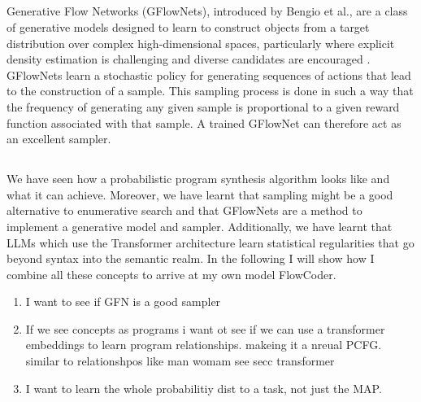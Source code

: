 \subsection{}
Generative Flow Networks (GFlowNets), introduced by Bengio et al., are a class of generative models designed to learn to construct objects from a target distribution over complex high-dimensional spaces, particularly where explicit density estimation is challenging and diverse candidates are encouraged \cite{bengio_flow_2021}. GFlowNets learn a stochastic policy for generating sequences of actions that lead to the construction of a sample. This sampling process is done in such a way that the frequency of generating any given sample is proportional to a given reward function associated with that sample. A trained GFlowNet can therefore act as an excellent sampler.
















\subsection{}

We have seen how a probabilistic program synthesis algorithm looks like and what it can achieve. 
Moreover, we have learnt that sampling might be a good alternative to enumerative search and that GFlowNets are a method to implement a generative model and sampler. Additionally, we have learnt that LLMs which use the Transformer architecture learn statistical regularities that go beyond syntax into the semantic realm. In the following I will show how I combine all these concepts to arrive at my own model \textrm{FlowCoder}.


\begin{enumerate}
    \item I want to see if GFN is a good sampler 
    \item If we see concepts as programs i want ot see if we can use a transformer embeddings to learn program relationships. makeing it a nreual PCFG. similar to relationshpos like man womam see secc transformer
    \item I want to learn the whole probabilitiy dist to a task, not just the MAP.
\end{enumerate} 




